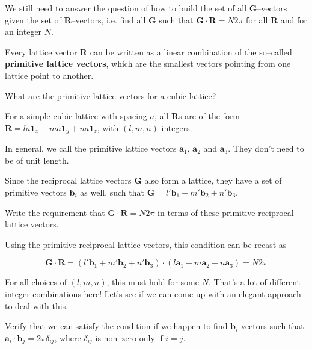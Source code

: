 We still need to answer the question of how to build the set of all ${\mathbf G}$--vectors given the set of ${\mathbf R}$--vectors, i.e. find all ${\mathbf G}$ such that ${\mathbf G} \cdot {\mathbf R} = N 2 \pi$ for all ${\mathbf R}$ and for an integer $N$.

Every lattice vector ${\mathbf R}$ can be written as a linear combination of the so--called \textbf{primitive lattice vectors}, which are the smallest vectors pointing from one lattice point to another.

\begin{cue}
  What are the primitive lattice vectors for a cubic lattice?
\end{cue}

For a simple cubic lattice with spacing $a$, all ${\mathbf R}$s are of the form ${\mathbf R} = la {\mathbf 1}_x + ma {\mathbf 1}_y + na {\mathbf 1}_z$, with $(l,m,n)$ integers.

In general, we call the primitive lattice vectors ${\mathbf a}_1$, ${\mathbf a}_2$ and ${\mathbf a}_3$. They don't need to be of unit length.

Since the reciprocal lattice vectors ${\mathbf G}$ also form a lattice, they have a set of primitive vectors ${\mathbf b}_i$ as well, such that ${\mathbf G} = l' {\mathbf b}_1 + m' {\mathbf b}_2 + n' {\mathbf b}_3$.

\begin{cue}
Write the requirement that ${\mathbf G} \cdot {\mathbf R} = N 2 \pi$ in terms of these primitive reciprocal lattice vectors.
\end{cue}

Using the primitive reciprocal lattice vectors, this condition can be recast as

\begin{equation}
{\mathbf G} \cdot {\mathbf R} = ( l' {\mathbf b}_1 + m' {\mathbf b}_2 + n' {\mathbf b}_3) \cdot (l {\mathbf a}_1 + m {\mathbf a}_2 + n {\mathbf a}_3)  = N 2 \pi 
\end{equation} 

For all choices of $(l,m,n)$, this must hold for some $N$. That's a lot of different integer combinations here! Let's see if we can come up with an elegant approach to deal with this.


\begin{cue}
Verify that we can satisfy the condition if we happen to find ${\mathbf b}_i$ vectors such that ${\mathbf a}_i \cdot {\mathbf b}_j = 2 \pi \delta_{ij}$, where $\delta_{ij}$ is non--zero only if $i=j$.
\end{cue}

